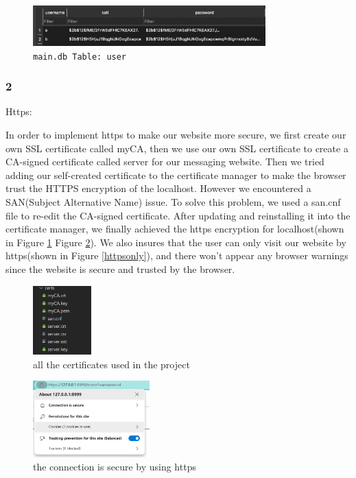 \documentclass[12pt]{article}
\begin{document}
        \begin{figure}[H]
            \centering
            \includegraphics[width=0.8\textwidth]{graphs/hashed_passwd.jpg}
            \caption{\texttt{main.db Table: user}}
        \end{figure}

	\subsubsection*{2}Https:

        In order to implement https to make our website more secure, we first create our own SSL certificate called myCA, then we use our own SSL certificate to create a CA-signed certificate called server for our messaging website. Then we tried adding our self-created certificate to the certificate manager to make the browser trust the HTTPS encryption of the localhost. However we encountered a SAN(Subject Alternative Name) issue. To solve this problem, we used a san.cnf file to re-edit the CA-signed certificate. After updating and reinstalling it into the certificate manager, we finally achieved the https encryption for localhost(shown in Figure \ref{certificates} Figure \ref{secureconnection}). We also insures that the user can only visit our website by https(shown in Figure \ref{httpsonly}), and there won't appear any browser warnings since the website is secure and trusted by the browser.

    	\begin{figure}[H]
            \centering
            \includegraphics[width=0.2\textwidth]{zzrgraphs/certificates.png}
            \caption{all the certificates used in the project}
    		\label{certificates}
        \end{figure}

    	\begin{figure}[H]
            \centering
            \includegraphics[width=0.4\textwidth]{zzrgraphs/connection_is_secure.png}
            \caption{the connection is secure by using https}
    		\label{secureconnection}
        \end{figure}
\end{document}
